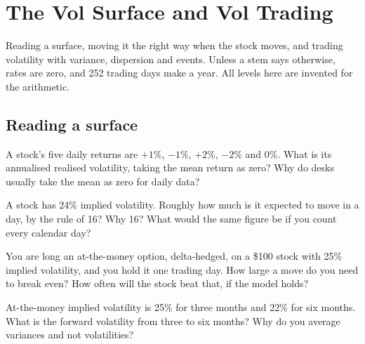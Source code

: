 \chapter{The Vol Surface and Vol Trading}\label{ch:iv2:vol-surface-and-vol-trading}

\begin{ivtrains}
Reading a surface, moving it the right way when the stock moves, and trading volatility with variance, dispersion and events. Unless a stem says otherwise, rates are zero, and 252 trading days make a year. All levels here are invented for the arithmetic.
\end{ivtrains}

\section{Reading a surface}

\begin{question}\label{iq:iv2:vol-surface-and-vol-trading:1}
A stock's five daily returns are $+1\%$, $-1\%$, $+2\%$, $-2\%$ and $0\%$. What is its annualised realised volatility, taking the mean return as zero? Why do desks usually take the mean as zero for daily data?
\end{question}

\begin{question}\label{iq:iv2:vol-surface-and-vol-trading:2}
A stock has 24\% implied volatility. Roughly how much is it expected to move in a day, by the rule of 16? Why 16? What would the same figure be if you count every calendar day?
\end{question}

\begin{question}\label{iq:iv2:vol-surface-and-vol-trading:3}
You are long an at-the-money option, delta-hedged, on a \$100 stock with 25\% implied volatility, and you hold it one trading day. How large a move do you need to break even? How often will the stock beat that, if the model holds?
\end{question}

\begin{question}\label{iq:iv2:vol-surface-and-vol-trading:4}
At-the-money implied volatility is 25\% for three months and 22\% for six months. What is the forward volatility from three to six months? Why do you average variances and not volatilities?
\end{question}


